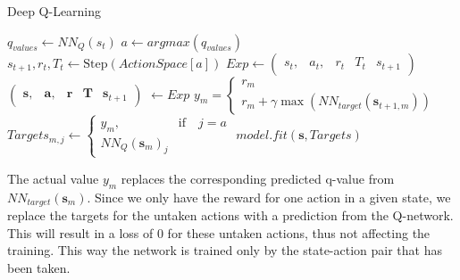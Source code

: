 \documentclass{LTHtwocol} %
\begin{document}
\begin{algorithm}[H]
	\label{alg:deep_q_training}
	\caption{Deep Q-Learning}
	\begin{algorithmic}
			 
				\State $q_{values} \gets NN_Q(s_t)$  %
				\State $a \gets argmax(q_{values})$ 	 
				\State $s_{t+1}, r_t, T_t \gets \text{Step}(ActionSpace[a])$ %
				\State $Exp \gets \begin{pmatrix} s_t, & a_t, & r_t & T_t & s_{t+1} \end{pmatrix}$
				\State $\begin{pmatrix} \mathbf{s}, & \mathbf{a}, & \mathbf{r} & \mathbf{T} & \mathbf{s}_{t+1} \end{pmatrix}$ $\gets Exp$  
				\State $y_m = \begin{cases} r_m \\ r_m + \gamma \max ( NN_{target}(\mathbf{s}_{t+1, m}) ) \end{cases}$
				\State $Targets_{m,j} \gets \begin{cases} y_m, & \text{if} \quad j = a  \\ NN_Q(\mathbf{s}_m)_j \end{cases}$
				\State $model.fit(\mathbf{s}, Targets)$
			\EndWhile
		\EndFor
	\end{algorithmic}
\end{algorithm}
The actual value $y_m$ replaces the corresponding predicted q-value from $NN_{target}(\mathbf{s}_m)$.
 Since we only have the reward for one action in a given state, we replace the targets for the untaken actions with a prediction from the Q-network. This will result in a loss of 0 for these untaken actions, thus not affecting the training.
 This way the network is trained only by the state-action pair that has been taken.




\end{document}
